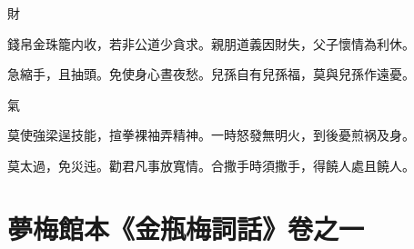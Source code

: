 財

\begin{myquote0}
錢帛金珠籠内收，若非公道少貪求。親朋道義因財失，父子懷情為利休。

急縮手，且抽頭。免使身心晝夜愁。兒孫自有兒孫福，莫與兒孫作遠憂。
\end{myquote0}

氣

\begin{myquote0}
莫使強梁逞技能，揎拳裸袖弄精神。一時怒發無明火，到後憂煎祸及身。

莫太過，免災迍。勸君凡事放寬情。合撒手時須撒手，得饒人處且饒人。
\end{myquote0}

\part*{夢梅館本《金瓶梅詞話》卷之一}

